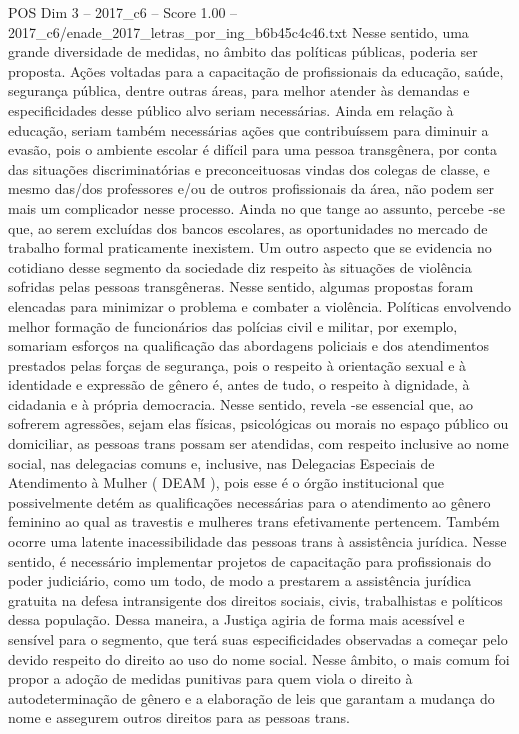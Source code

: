 \begin{textsample}{POS Dim 3 – 2017\_c6 – Score 1.00 – 2017\_c6/enade\_2017\_letras\_por\_ing\_b6b45c4c46.txt}
Nesse sentido, uma grande diversidade de medidas, no âmbito das políticas públicas, poderia ser proposta.
Ações voltadas para a capacitação de profissionais da educação, saúde, segurança pública, dentre outras áreas, para melhor atender às demandas e especificidades desse público alvo seriam necessárias.
Ainda em relação à educação, seriam também necessárias ações que contribuíssem para diminuir a evasão, pois o ambiente escolar é difícil para uma pessoa transgênera, por conta das situações discriminatórias e preconceituosas vindas dos colegas de classe, e mesmo das/dos professores e/ou de outros profissionais da área, não podem ser mais um complicador nesse processo.
Ainda no que tange ao assunto, percebe -se que, ao serem excluídas dos bancos escolares, as oportunidades no mercado de trabalho formal praticamente inexistem.
Um outro aspecto que se evidencia no cotidiano desse segmento da sociedade diz respeito às situações de violência sofridas pelas pessoas transgêneras.
Nesse sentido, algumas propostas foram elencadas para minimizar o problema e combater a violência.
Políticas envolvendo melhor formação de funcionários das polícias civil e militar, por exemplo, somariam esforços na qualificação das abordagens policiais e dos atendimentos prestados pelas forças de segurança, pois o respeito à orientação sexual e à identidade e expressão de gênero é, antes de tudo, o respeito à dignidade, à cidadania e à própria democracia.
Nesse sentido, revela -se essencial que, ao sofrerem agressões, sejam elas físicas, psicológicas ou morais no espaço público ou domiciliar, as pessoas trans possam ser atendidas, com respeito inclusive ao nome social, nas delegacias comuns e, inclusive, nas Delegacias Especiais de Atendimento à Mulher ( DEAM ), pois esse é o órgão institucional que possivelmente detém as qualificações necessárias para o atendimento ao gênero feminino ao qual as travestis e mulheres trans efetivamente pertencem.
Também ocorre uma latente inacessibilidade das pessoas trans à assistência jurídica.
Nesse sentido, é necessário implementar projetos de capacitação para profissionais do poder judiciário, como um todo, de modo a prestarem a assistência jurídica gratuita na defesa intransigente dos direitos sociais, civis, trabalhistas e políticos dessa população.
Dessa maneira, a Justiça agiria de forma mais acessível e sensível para o segmento, que terá suas especificidades observadas a começar pelo devido respeito do direito ao uso do nome social.
Nesse âmbito, o mais comum foi propor a adoção de medidas punitivas para quem viola o direito à autodeterminação de gênero e a elaboração de leis que garantam a mudança do nome e assegurem outros direitos para as pessoas trans.

\end{textsample}
